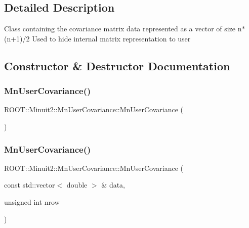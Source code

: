 \subsection{Detailed Description}
Class containing the covariance matrix data represented as a vector of size n$\ast$(n+1)/2 Used to hide internal matrix representation to user 

\subsection{Constructor \& Destructor Documentation}
\mbox{\label{classROOT_1_1Minuit2_1_1MnUserCovariance_a40b83657c20ed7612fd58971145e2150}} 
\subsubsection{\texorpdfstring{MnUserCovariance()}{MnUserCovariance()}\hspace{0.1cm}{\footnotesize\ttfamily [1/12]}}
{\footnotesize\ttfamily R\+O\+O\+T\+::\+Minuit2\+::\+Mn\+User\+Covariance\+::\+Mn\+User\+Covariance (\begin{DoxyParamCaption}{ }\end{DoxyParamCaption})\hspace{0.3cm}{\ttfamily [inline]}}

\mbox{\label{classROOT_1_1Minuit2_1_1MnUserCovariance_aeb4bbc60170bc2b4694b9064b4f6761c}} 
\subsubsection{\texorpdfstring{MnUserCovariance()}{MnUserCovariance()}\hspace{0.1cm}{\footnotesize\ttfamily [2/12]}}
{\footnotesize\ttfamily R\+O\+O\+T\+::\+Minuit2\+::\+Mn\+User\+Covariance\+::\+Mn\+User\+Covariance (\begin{DoxyParamCaption}\item[{const std\+::vector$<$ double $>$ \&}]{data,  }\item[{unsigned int}]{nrow }\end{DoxyParamCaption})\hspace{0.3cm}{\ttfamily [inline]}}

